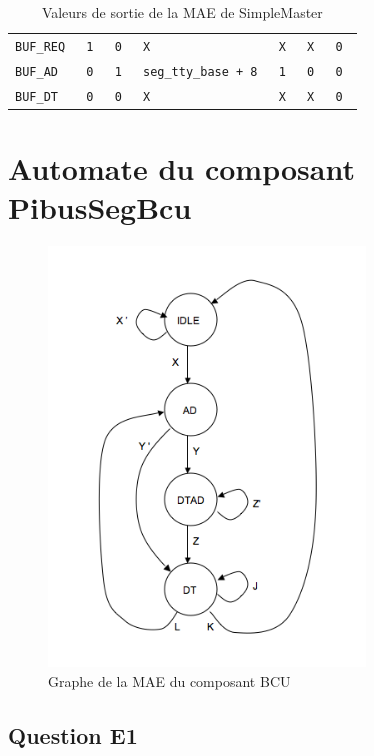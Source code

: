 \documentclass{article}
\begin{document}
\begin{table}[H]
\begin{tabular}{|l|l|l|l|l|l|l|}
\tt{BUF\_REQ}     & \tt{1}         & \tt{0}         & \tt{X}                  & \tt{X}             & \tt{X}         & \tt{0}         \\
\tt{BUF\_AD}      & \tt{0}         & \tt{1}         & \tt{seg\_tty\_base + 8} & \tt{1}             & \tt{0}         & \tt{0}         \\
\tt{BUF\_DT}      & \tt{0}         & \tt{0}         & \tt{X}                  & \tt{X}             & \tt{X}         & \tt{0}         \\
\hline
\end{tabular}
\endgroup
\caption{Valeurs de sortie de la MAE de SimpleMaster}
\end{table}


\section{Automate du composant PibusSegBcu}

\begin{figure}[H]
\includegraphics[width=0.75\textwidth]{pics/mae_bus.png}
\centering
\caption{Graphe de la MAE du composant BCU}
\label{mae_ram}
\end{figure}

\subsection{Question E1}
\end{document}
